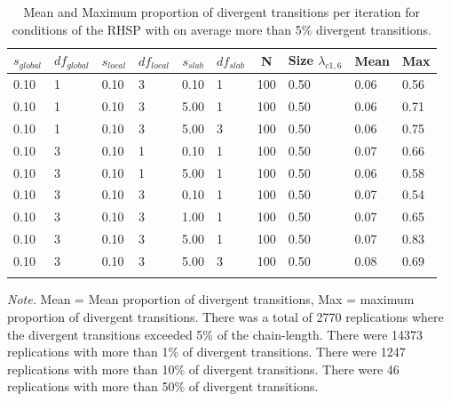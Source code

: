\documentclass[
  man, donotrepeattitle,floatsintext]{apa6}
\begin{document}
\begin{table}[tbp]

\begin{center}
\begin{threeparttable}

\caption{\label{tab:unnamed-chunk-4}Mean and Maximum proportion of divergent transitions per iteration for conditions of the RHSP with on average more than 5\% divergent transitions.}

\begin{tabular}{llllllllll}
\toprule
$s_{global}$ & \multicolumn{1}{c}{$df_{global}$} & \multicolumn{1}{c}{$s_{local}$} & \multicolumn{1}{c}{$df_{local}$} & \multicolumn{1}{c}{$s_{slab}$} & \multicolumn{1}{c}{$df_{slab}$} & \multicolumn{1}{c}{N} & \multicolumn{1}{c}{Size $\lambda_{c1 , 6}$} & \multicolumn{1}{c}{Mean} & \multicolumn{1}{c}{Max}\\
\midrule
0.10 & 1 & 0.10 & 3 & 0.10 & 1 & 100 & 0.50 & 0.06 & 0.56\\
0.10 & 1 & 0.10 & 3 & 5.00 & 1 & 100 & 0.50 & 0.06 & 0.71\\
0.10 & 1 & 0.10 & 3 & 5.00 & 3 & 100 & 0.50 & 0.06 & 0.75\\
0.10 & 3 & 0.10 & 1 & 0.10 & 1 & 100 & 0.50 & 0.07 & 0.66\\
0.10 & 3 & 0.10 & 1 & 5.00 & 1 & 100 & 0.50 & 0.06 & 0.58\\
0.10 & 3 & 0.10 & 3 & 0.10 & 1 & 100 & 0.50 & 0.07 & 0.54\\
0.10 & 3 & 0.10 & 3 & 1.00 & 1 & 100 & 0.50 & 0.07 & 0.65\\
0.10 & 3 & 0.10 & 3 & 5.00 & 1 & 100 & 0.50 & 0.07 & 0.83\\
0.10 & 3 & 0.10 & 3 & 5.00 & 3 & 100 & 0.50 & 0.08 & 0.69\\
\bottomrule
\addlinespace
\end{tabular}

\begin{tablenotes}[para]
\normalsize{\textit{Note.} Mean = Mean proportion of divergent transitions, Max = maximum proportion of divergent transitions. There was a total of 2770 replications where the divergent transitions exceeded 5\% of the chain-length. There were 14373 replications with more than 1\% of divergent transitions. There were 1247 replications with more than 10\% of divergent transitions. There were 46 replications with more than 50\% of divergent transitions.}
\end{tablenotes}

\end{threeparttable}
\end{center}

\end{table}
\end{document}

